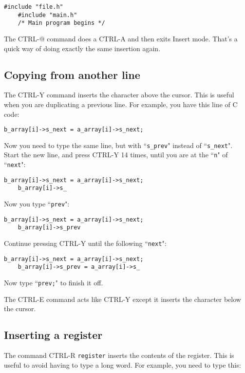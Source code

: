 \begin{Verbatim}[samepage=true]
    #include "file.h" 
    #include "main.h" 
    /* Main program begins */ 
\end{Verbatim}

The CTRL-@ command does a CTRL-A and then exits Insert mode.
That's a quick way of doing exactly the same insertion again.
\subsection{Copying from another line}
The CTRL-Y command inserts the character above the cursor.
This is useful when you are duplicating a previous line.
For example, you have this line of C code:

\begin{Verbatim}[samepage=true]
    b_array[i]->s_next = a_array[i]->s_next; 
\end{Verbatim}

Now you need to type the same line, but with ``\texttt{s\_prev}" instead of ``\texttt{s\_next}".
Start the new line, and press CTRL-Y 14 times, until you are at the ``\texttt{n}" of ``\texttt{next}":

\begin{Verbatim}[samepage=true]
    b_array[i]->s_next = a_array[i]->s_next; 
    b_array[i]->s_ 
\end{Verbatim}

Now you type ``\texttt{prev}":

\begin{Verbatim}[samepage=true]
    b_array[i]->s_next = a_array[i]->s_next; 
    b_array[i]->s_prev 
\end{Verbatim}

Continue pressing CTRL-Y until the following ``\texttt{next}":

\begin{Verbatim}[samepage=true]
    b_array[i]->s_next = a_array[i]->s_next; 
    b_array[i]->s_prev = a_array[i]->s_ 
\end{Verbatim}

Now type ``\texttt{prev;}" to finish it off.

The CTRL-E command acts like CTRL-Y except it inserts the character below the cursor.
\subsection{Inserting a register}
The command CTRL-R \texttt{{register}} inserts the contents of the register.
This is useful to avoid having to type a long word.
For example, you need to type this:

